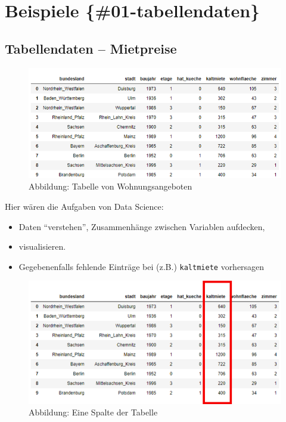 \documentclass[]{book}
\providecommand{\tightlist}{%
  \setlength{\itemsep}{0pt}\setlength{\parskip}{0pt}}
\theoremstyle{definition}
\theoremstyle{definition}
\theoremstyle{definition}
\theoremstyle{definition}
\theoremstyle{remark}
\begin{document}
\hypertarget{beispiele-01-tabellendaten}{%
\section{Beispiele \{\#01-tabellendaten\}}\label{beispiele-01-tabellendaten}}

\hypertarget{tabellendaten-mietpreise}{%
\subsection{Tabellendaten -- Mietpreise}\label{tabellendaten-mietpreise}}

\begin{figure}
\centering
\includegraphics{bilder/dataframe.png}
\caption{Abbildung: Tabelle von Wohnungsangeboten}
\end{figure}

Hier wären die Aufgaben von Data Science:

\begin{itemize}
\tightlist
\item
  Daten ``verstehen'', Zusammenhänge zwischen
  Variablen aufdecken,
\item
  visualisieren.
\item
  Gegebenenfalls fehlende Einträge bei (z.B.) \texttt{kaltmiete} vorhersagen
\end{itemize}

\begin{figure}
\centering
\includegraphics{bilder/dataframe_spalte.png}
\caption{Abbildung: Eine Spalte der Tabelle}
\end{figure}
\end{document}
